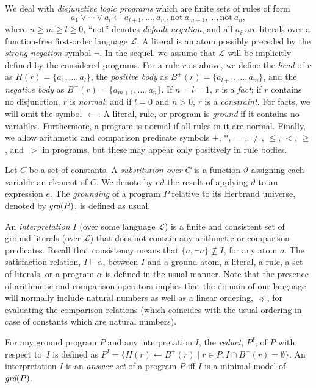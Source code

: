 \documentclass{tlp}
\renewcommand{\L}{\mathcal{L}}
\newcommand{\naf}{\mathrm{not}}
\newcommand{\posbody}{B^{+}}
\newcommand{\negbody}{B^{-}}
\newcommand{\head}{H}
\newcommand{\grd}{\mathit{ground}}
\renewcommand{\grd}{\mathit{grd}}
\newcommand{\subst}{\vartheta}
\newcommand{\wrt}{with respect to}
\renewcommand{\mathit}[1]{{\text{\it{#1}}}}
\begin{document}
We deal with \emph{disjunctive logic programs}  which are finite sets of rules of form
\[
a_1 \vee \cdots \vee a_l \leftarrow a_{l+1}, \ldots, a_{m}, \naf\ a_{m+1}, \ldots, \naf\ a_{n} , 
\]
where $n \geq m \geq l \geq 0$, ``$\naf$'' denotes \emph{default negation}, and  all $a_i$ are literals over 
a function-free first-order language $\L$. A literal is an atom possibly preceded by the \emph{strong negation} symbol $\neg$.
In the sequel, we assume that $\L$ will be implicitly defined by the considered programs.
For a rule $r$ as above, we define the \emph{head}  of $r$ as $\head(r) = \{a_1,  \ldots,  a_l\}$, 
the \emph{positive body} as $\posbody(r) = \{a_{l+1}, \ldots, a_{m}\}$, and  the \emph{negative body} as $\negbody(r) = \{a_{m+1}, \ldots, a_{n}\}$. 
If $n=l=1$,
$r$  is a \emph{fact}; if $r$ contains no disjunction, $r$ is \emph{normal}; and
if $l=0$ and $n>0$,
$r$ is a \emph{constraint}. For facts, we will omit the symbol $\leftarrow$.
A literal, rule, or program is \emph{ground} if it contains no variables.
Furthermore, a program is normal if all rules in it are normal. 
Finally, we allow arithmetic and comparison predicate symbols $+$, $*$, $=$, $\neq$, $\leq$, $<$, $\geq$, and~$>$ in programs, but these may appear only positively in rule bodies.

Let $C$ be a set of constants. A \emph{substitution over} $C$ is a function $\subst$ assigning each variable an element of $C$.
We denote by $e\subst$ the result of applying $\subst$ to an expression $e$.
The \emph{grounding} of a  program $P$ relative to its Herbrand universe, denoted by $\grd(P)$, is defined as usual.

An \emph{interpretation} $I$ (over some language $\L$) is a finite and consistent set of ground literals (over $\L$) that does not contain any arithmetic or comparison predicates.
Recall that consistency means that $\{a,\neg a\}\not\subseteq I$, for any atom $a$.
The satisfaction relation, $I\models \alpha$, between $I$ and a ground atom, a literal, 
a rule, a set of literals, or a program $\alpha$ is defined in the usual manner.
Note that the presence of arithmetic and comparison operators implies that the domain of our language will normally include natural numbers as well as a linear ordering, $\preceq$, 
for evaluating the comparison relations (which coincides with the usual ordering in case of constants which are natural numbers).

For any ground program $P$ and any interpretation $I$, the \emph{reduct}, $P^{I}$, of $P$ \wrt\ $I$ \cite{gelfond91}
is defined as 
$P^{I} = \{\head(r) \leftarrow \posbody(r) \mid r \in P, I \cap \negbody(r) = \emptyset \}$.
An interpretation $I$ is an \emph{answer set} of a program $P$ iff $I$ is  a minimal model of $\grd(P)$.
\end{document}
